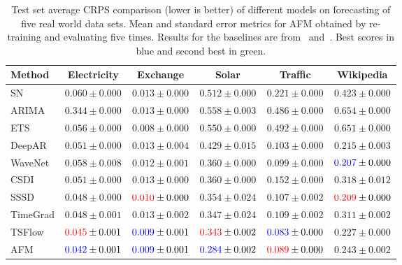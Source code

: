 \documentclass[a4paper,10pt,twocolumn,preprint,3p]{elsarticle}
\begin{document}
\begin{table}[!tbp]
  \centering
  \setlength{\tabcolsep}{4pt}
  \caption{Test set average CRPS comparison (lower is better) of different models on forecasting of five real world data sets. Mean and standard error metrics for AFM obtained by re-training and evaluating five times. Results for the baselines are from~\citep{Kerrigan2024Flow} and~\citep{rasul2021autoregressive}. Best scores in blue and second best in green.}
  \label{tab:forecasting}
\begin{small}
  \begin{tabular}{lccccc}
    \toprule
    Method & Electricity & Exchange & Solar & Traffic & Wikipedia \\
    \midrule
    SN               & $0.060 \pm 0.000$ & $0.013 \pm 0.000$ & $0.512 \pm 0.000$ & $0.221 \pm 0.000$ & $0.423 \pm 0.000$ \\
    ARIMA            & $0.344 \pm 0.000$ & $0.013 \pm 0.000$ & $0.558 \pm 0.003$ & $0.486 \pm 0.000$ & $0.654 \pm 0.000$ \\
    ETS              & $0.056 \pm 0.000$ & $0.008 \pm 0.000$ & $0.550 \pm 0.000$ & $0.492 \pm 0.000$ & $0.651 \pm 0.000$ \\
    DeepAR           & $0.051 \pm 0.000$ & $0.013 \pm 0.004$ & $0.429 \pm 0.015$ & $0.103 \pm 0.000$ & $0.215 \pm 0.003$ \\
    WaveNet          & $0.058 \pm 0.008$ & $0.012 \pm 0.001$ & $0.360 \pm 0.000$ & $0.099 \pm 0.000$ & $\textcolor{blue}{0.207} \pm 0.000$ \\
    CSDI             & $0.051 \pm 0.000$ & $0.013 \pm 0.000$ & $0.360 \pm 0.000$ & $0.152 \pm 0.000$ & $0.318 \pm 0.012$ \\
    SSSD             & $0.048 \pm 0.000$ & $\textcolor{red}{0.010} \pm 0.000$ & $0.354 \pm 0.024$ & $0.107 \pm 0.002$ & $\textcolor{red}{0.209} \pm 0.000$ \\
    TimeGrad         & $0.048 \pm 0.001$ & $0.013 \pm 0.002$ & $0.347 \pm 0.024$ & $0.109 \pm 0.002$ & $0.311 \pm 0.002$ \\
    TSFlow           & $\textcolor{red}{0.045} \pm 0.001$ & $\textcolor{blue}{0.009} \pm 0.001$ & $\textcolor{red}{0.343} \pm 0.002$ & $\textcolor{blue}{0.083} \pm 0.000$ & $0.227 \pm 0.000$ \\
    AFM              & $\textcolor{blue}{0.042} \pm 0.001$ & $\textcolor{blue}{0.009} \pm 0.001$ & $\textcolor{blue}{0.284} \pm 0.002$ & $\textcolor{red}{0.089} \pm 0.000$ & $0.243 \pm 0.002$ \\
    \bottomrule
  \end{tabular}
  \end{small}
\end{table}
\end{document}
